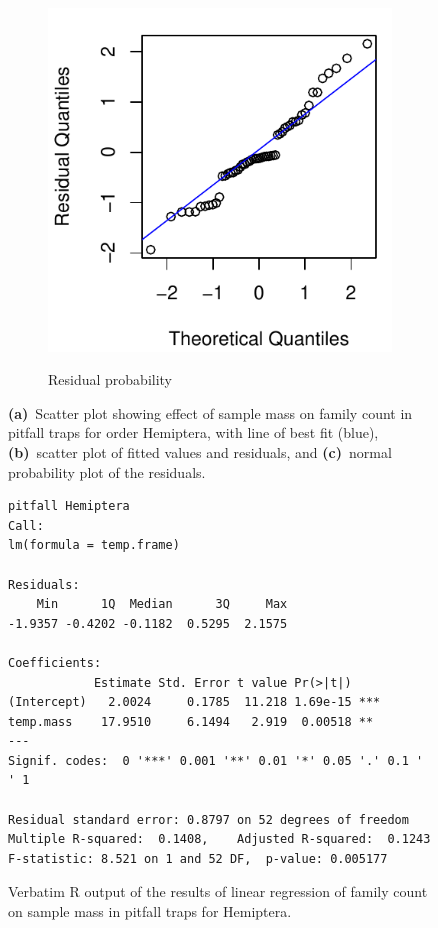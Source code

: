 \documentclass[10pt,letterpaper,twocolumn]{article}
\begin{document}
\begin{figure}[h]
\begin{subfigure}[b]{0.15\textwidth}
		\label{fig:pitfall_hemiptera_resid}
	\end{subfigure}
	~
	\begin{subfigure}[b]{0.15\textwidth}
		\caption{Residual probability}
		\includegraphics[width=\textwidth]{plots/mass-vs-count/qqplot/2015_pitfall_Hemiptera_qqplot.pdf}
		\label{fig:pitfall_hemiptera_qqplot}
	\end{subfigure}
	\caption{\textbf{(a)}~Scatter plot showing effect of sample mass on family count in pitfall traps for order Hemiptera, with line of best fit (blue), \textbf{(b)}~scatter plot of fitted values and residuals, and \textbf{(c)}~normal probability plot of the residuals.}
	\label{fig:pitfall_hemiptera}
	\smallskip
	\nointerlineskip
	\hrulefill
\end{figure}

\begin{figure}[h]
	\lstset{numbers=left}
	\lstset{xleftmargin=5mm,framexleftmargin=5mm}
	\begin{lstlisting}
pitfall Hemiptera
Call:
lm(formula = temp.frame)

Residuals:
    Min      1Q  Median      3Q     Max 
-1.9357 -0.4202 -0.1182  0.5295  2.1575 

Coefficients:
            Estimate Std. Error t value Pr(>|t|)    
(Intercept)   2.0024     0.1785  11.218 1.69e-15 ***
temp.mass    17.9510     6.1494   2.919  0.00518 ** 
---
Signif. codes:  0 '***' 0.001 '**' 0.01 '*' 0.05 '.' 0.1 ' ' 1

Residual standard error: 0.8797 on 52 degrees of freedom
Multiple R-squared:  0.1408,	Adjusted R-squared:  0.1243 
F-statistic: 8.521 on 1 and 52 DF,  p-value: 0.005177
	\end{lstlisting}
	\caption{Verbatim R output of the results of linear regression of family count on sample mass in pitfall traps for Hemiptera.}
	\label{fig:pitfall_hemiptera_regression}
	\smallskip
	\nointerlineskip
	\hrulefill
\end{figure}
\end{document}
